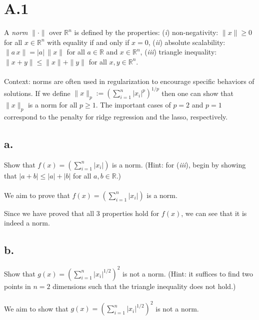 \documentclass{article}
\newcommand{\field}[1]{\mathbb{#1}}
\newcommand{\1}{\mathbf{1}}
\newcommand{\R}{\field{R}} %
\begin{document}
\section*{A.1}
{\Large

A \emph{norm} $\|\cdot\|$ over $\R^n$ is defined by the properties:
(\textit{i}) non-negativity: $\|x\|\geq 0$ for all $x \in \R^n$ with equality if and only if $x=0$,
(\textit{ii}) absolute scalability: $\|a \, x\| = |a| \, \|x\|$ for all $a \in \R$ and $x \in \R^n$, 
(\textit{iii}) triangle inequality: $\|x+y\| \leq \|x\| + \|y\|$ for all $x,y \in \R^n$. \\ \\

Context: norms are often used in regularization to encourage specific behaviors of solutions. If we define  $\| x \|_p := \left( \sum_{i=1}^n |x_i|^{p} \right)^{1/p}$ then one can show that $\| x \|_p$ is a norm for all $p \geq 1$. The important cases of $p=2$ and $p=1$ correspond to the penalty for ridge regression and the lasso, respectively.

\subsection*{a.}

Show that $f(x) = \left( \sum_{i=1}^n |x_i| \right)$ is a norm. (Hint: for (\textit{iii}), begin by showing that $|a+b|\leq |a| + |b|$ for all $a,b \in \R$.) \\ \\ 

We aim to prove that $f(x) = \left( \sum_{i=1}^n |x_i| \right)$ is a norm.

Since we have proved that all 3 properties hold for $f(x)$, we can see that it is indeed a norm. 

\subsection*{b.}

Show that $g(x) = \left(\sum_{i=1}^n |x_i|^{1/2}\right)^2$ is not a norm. (Hint: it suffices to find two points in $n=2$ dimensions such that the triangle inequality does not hold.) \\ \\

We aim to show that $g(x) = \left(\sum_{i=1}^n |x_i|^{1/2}\right)^2$ is not a norm. 

}
\end{document}
